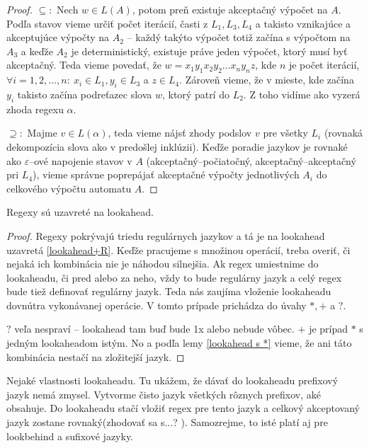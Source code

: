 \begin{proof}
$\subseteq:$ Nech $w \in L(A)$, potom preň existuje akceptačný výpočet na $A$. Podľa stavov vieme určiť počet iterácií, časti z $L_1,L_3,L_4$ a takisto vznikajúce a akceptujúce výpočty na $A_2$ -- každý takýto výpočet totiž začína s výpočtom na $A_3$ a keďže $A_2$ je de\-ter\-mi\-nis\-tic\-ký, existuje práve jeden výpočet, ktorý musí byť akceptačný. Teda vieme povedať, že $w = x_1y_1x_2y_2 \dots x_ny_nz$, kde $n$ je počet iterácií, $\forall i = 1, 2, \dots, n : ~ x_i \in L_1, y_i \in L_3 $ a $z \in L_4$. Zároveň vieme, že v mieste, kde začína $y_i$ takisto začína podreťazec slova $w$, ktorý patrí do $L_2$. Z toho vidíme ako vyzerá zhoda regexu $\alpha$.

$\supseteq:$ Majme $v \in L(\alpha)$, teda vieme nájsť zhody podslov $v$ pre všetky $L_i$ (rovnaká dekompozícia slova ako v predošlej inklúzii). Keďže poradie jazykov je rovnaké ako $\varepsilon$--ové napojenie stavov v $A$ (akceptačný--počiatočný, akceptačný--akceptačný pri $L_4$), vieme správne poprepájať akceptačné výpočty jednotlivých $A_i$ do celkového výpočtu automatu $A$.
\end{proof}

\begin{veta} \label{reg_uz_la}
Regexy sú uzavreté na lookahead.
\end{veta}
\begin{proof}
Regexy pokrývajú triedu regulárnych jazykov a tá je na lookahead uzavretá \ref{lookahead+R}. Keďže pracujeme s množinou operácií, treba overiť, či nejaká ich kombinácia nie je náhodou silnejšia. Ak regex umiestnime do lookaheadu, či pred alebo za neho, vždy to bude regulárny jazyk a celý regex bude tiež definovať regulárny jazyk. Teda nás zaujíma vloženie lookaheadu dovnútra vykonávanej operácie. V tomto prípade prichádza do úvahy $*,+$ a $?$.

$?$ veľa nespraví -- lookahead tam buď bude 1x alebo nebude vôbec. $+$ je prípad $*$ s jedným lookaheadom istým. No a podľa lemy \ref{lookahead s *} vieme, že ani táto kombinácia nestačí na zložitejší jazyk.
\end{proof}

Nejaké vlastnosti lookaheadu.
Tu ukážem, že dávať do lookaheadu prefixový jazyk nemá zmysel. Vytvorme čisto jazyk všetkých rôznych prefixov, aké obsahuje. Do lookaheadu stačí vložiť regex pre tento jazyk a celkový akceptovaný jazyk zostane rovnaký(zhodovať sa s...? \todo). Samozrejme, to isté platí aj pre lookbehind a sufixové jazyky.

